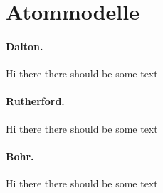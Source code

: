 \section{Atommodelle}

\paragraph{Dalton.}

Hi there there should be some text

\paragraph{Rutherford.}

Hi there there should be some text

\paragraph{Bohr.}

Hi there there should be some text